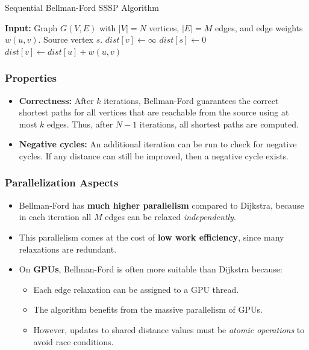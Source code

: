 \documentclass[12pt]{book}
\begin{document}
\begin{algorithm}[H]
\caption{Sequential Bellman-Ford SSSP Algorithm}
\label{alg:Bellman-Ford}
\begin{algorithmic}[1]
\State \textbf{Input:} Graph $G(V,E)$ with $|V| = N$ vertices, $|E| = M$ edges, and edge weights $w(u,v)$. Source vertex $s$.
    \State $dist[v] \gets \infty$
\EndFor
\State $dist[s] \gets 0$
            \State $dist[v] \gets dist[u] + w(u,v)$
        \EndIf
    \EndFor
\EndFor
\end{algorithmic}
\end{algorithm}

\subsubsection*{Properties}
\begin{itemize}
    \item \textbf{Correctness:} After $k$ iterations, Bellman-Ford guarantees the correct shortest paths for all vertices that are reachable from the source using at most $k$ edges. Thus, after $N-1$ iterations, all shortest paths are computed.
    \item \textbf{Negative cycles:} An additional iteration can be run to check for negative cycles. If any distance can still be improved, then a negative cycle exists.
\end{itemize}

\subsubsection*{Parallelization Aspects}
\begin{itemize}
    \item Bellman-Ford has \textbf{much higher parallelism} compared to Dijkstra, because in each iteration all $M$ edges can be relaxed \emph{independently}.
    \item This parallelism comes at the cost of \textbf{low work efficiency}, since many relaxations are redundant.
    \item On \textbf{GPUs}, Bellman-Ford is often more suitable than Dijkstra because:
    \begin{itemize}
        \item Each edge relaxation can be assigned to a GPU thread.
        \item The algorithm benefits from the massive parallelism of GPUs.
        \item However, updates to shared distance values must be \emph{atomic operations} to avoid race conditions.
    \end{itemize}
\end{itemize}
\end{document}
